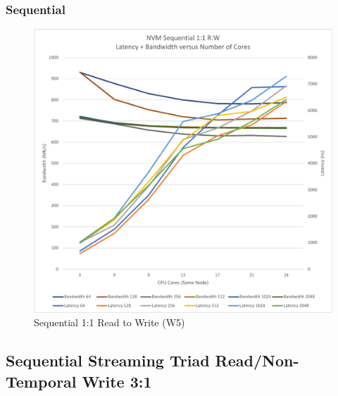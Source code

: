 \subsubsection{Sequential}

\begin{figure}
    \centering
    \caption{Sequential 1:1 Read to Write (W5)}\label{chart:sequential:W5}
    \includegraphics[scale=0.5]{charts/sequential-w5-crop.pdf}
\end{figure}

\subsection{Sequential Streaming Triad Read/Non-Temporal Write 3:1}

